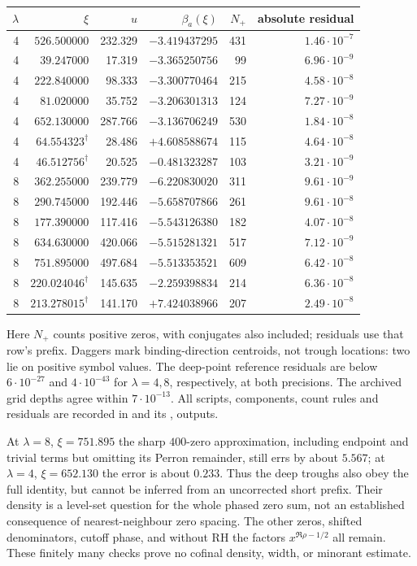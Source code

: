 \begin{center}
\small
\begin{tabular}{rrrrrr}
$\lambda$&$\xi$&$u$&$\beta_a(\xi)$&$N_+$&absolute residual\\\hline
4&$526.500000$&232.329&$-3.419437295$&431&$1.46\cdot10^{-7}$\\
4&$39.247000$&17.319&$-3.365250756$&99&$6.96\cdot10^{-9}$\\
4&$222.840000$&98.333&$-3.300770464$&215&$4.58\cdot10^{-8}$\\
4&$81.020000$&35.752&$-3.206301313$&124&$7.27\cdot10^{-9}$\\
4&$652.130000$&287.766&$-3.136706249$&530&$1.84\cdot10^{-8}$\\
4&$64.554323^{\dagger}$&28.486&$+4.608588674$&115&$4.64\cdot10^{-8}$\\
4&$46.512756^{\dagger}$&20.525&$-0.481323287$&103&$3.21\cdot10^{-9}$\\
8&$362.255000$&239.779&$-6.220830020$&311&$9.61\cdot10^{-9}$\\
8&$290.745000$&192.446&$-5.658707866$&261&$9.61\cdot10^{-8}$\\
8&$177.390000$&117.416&$-5.543126380$&182&$4.07\cdot10^{-8}$\\
8&$634.630000$&420.066&$-5.515281321$&517&$7.12\cdot10^{-9}$\\
8&$751.895000$&497.684&$-5.513353521$&609&$6.42\cdot10^{-8}$\\
8&$220.024046^{\dagger}$&145.635&$-2.259398834$&214&$6.36\cdot10^{-8}$\\
8&$213.278015^{\dagger}$&141.170&$+7.424038966$&207&$2.49\cdot10^{-8}$\\
\end{tabular}
\end{center}
Here $N_+$ counts positive zeros, with conjugates also included;
residuals use that row's prefix. Daggers mark binding-direction
centroids, not trough locations: two lie on positive symbol values.
The deep-point reference residuals are below $6\cdot10^{-27}$ and
$4\cdot10^{-43}$ for $\lambda=4,8$, respectively, at both precisions.
The archived grid depths agree within $7\cdot10^{-13}$.
All scripts, components, count rules and residuals are recorded in
 and its
,  outputs.

At $\lambda=8$, $\xi=751.895$ the sharp $400$-zero approximation,
including endpoint and trivial terms but omitting its Perron remainder,
still errs by about $5.567$; at $\lambda=4$, $\xi=652.130$ the error
is about $0.233$. Thus the deep troughs also obey the full identity,
but cannot be inferred from an uncorrected short prefix. Their density
is a level-set question for the whole phased zero sum, not an established
consequence of nearest-neighbour zero spacing. The other zeros, shifted
denominators, cutoff phase, and without RH the factors
$x^{\Re\rho-1/2}$ all remain. These finitely many checks prove no
cofinal density, width, or minorant estimate.

